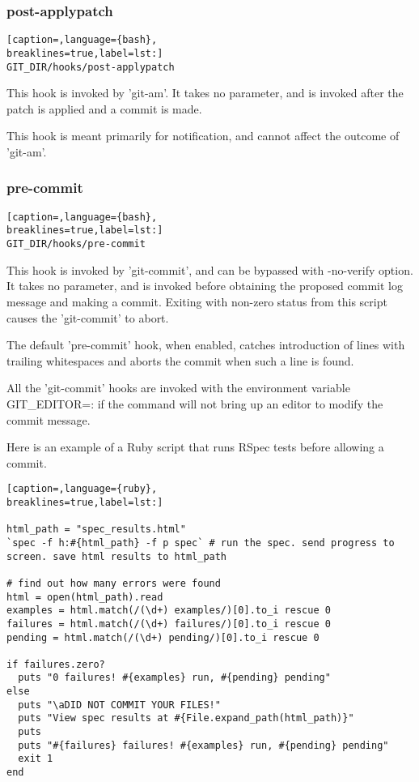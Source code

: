 \subsubsection{post-applypatch}
\lstset{basicstyle=\scriptsize, numbers=none, captionpos=b, tabsize=4}
\begin{lstlisting}[caption=,language={bash},
breaklines=true,label=lst:]
GIT_DIR/hooks/post-applypatch
\end{lstlisting}

This hook is invoked by 'git-am'. It takes no parameter, and is invoked after
the patch is applied and a commit is made.

This hook is meant primarily for notification, and cannot affect the outcome of
'git-am'.

\subsubsection{pre-commit}
\lstset{basicstyle=\scriptsize, numbers=none, captionpos=b, tabsize=4}
\begin{lstlisting}[caption=,language={bash},
breaklines=true,label=lst:]
GIT_DIR/hooks/pre-commit
\end{lstlisting}

This hook is invoked by 'git-commit', and can be bypassed with \--no-verify
option. It takes no parameter, and is invoked before obtaining the proposed
commit log message and making a commit. Exiting with non-zero status from this
script causes the 'git-commit' to abort.

The default 'pre-commit' hook, when enabled, catches introduction of lines with
trailing whitespaces and aborts the commit when such a line is found.

All the 'git-commit' hooks are invoked with the environment variable
GIT\_EDITOR=: if the command will not bring up an editor to modify the commit
message.

Here is an example of a Ruby script that runs RSpec tests before allowing a
commit.
\lstset{basicstyle=\scriptsize, numbers=none, captionpos=b, tabsize=4}
\begin{lstlisting}[caption=,language={ruby},
breaklines=true,label=lst:]
  
html_path = "spec_results.html"  
`spec -f h:#{html_path} -f p spec` # run the spec. send progress to screen. save html results to html_path  

# find out how many errors were found  
html = open(html_path).read  
examples = html.match(/(\d+) examples/)[0].to_i rescue 0  
failures = html.match(/(\d+) failures/)[0].to_i rescue 0  
pending = html.match(/(\d+) pending/)[0].to_i rescue 0  

if failures.zero?  
  puts "0 failures! #{examples} run, #{pending} pending"  
else  
  puts "\aDID NOT COMMIT YOUR FILES!"  
  puts "View spec results at #{File.expand_path(html_path)}"  
  puts  
  puts "#{failures} failures! #{examples} run, #{pending} pending"  
  exit 1  
end
\end{lstlisting}

